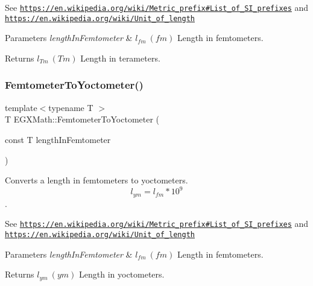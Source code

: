 See \href{https://en.wikipedia.org/wiki/Metric_prefix#List_of_SI_prefixes}{\tt https\+://en.\+wikipedia.\+org/wiki/\+Metric\+\_\+prefix\#\+List\+\_\+of\+\_\+\+S\+I\+\_\+prefixes} and \href{https://en.wikipedia.org/wiki/Unit_of_length}{\tt https\+://en.\+wikipedia.\+org/wiki/\+Unit\+\_\+of\+\_\+length} 
\begin{DoxyParams}{Parameters}
{\em length\+In\+Femtometer} & $ l_{fm}\ (fm)$ Length in femtometers. \\
\hline
\end{DoxyParams}
\begin{DoxyReturn}{Returns}
$ l_{Tm}\ (Tm)$ Length in terameters. 
\end{DoxyReturn}
\mbox{\label{group___e_g_x_math-_conversions-_length_conversions-_s_i-_femtometer-_s_i_ga6406395140da34327a85098a7dd9e4f0}} 
\subsubsection{\texorpdfstring{Femtometer\+To\+Yoctometer()}{FemtometerToYoctometer()}}
{\footnotesize\ttfamily template$<$typename T $>$ \\
T E\+G\+X\+Math\+::\+Femtometer\+To\+Yoctometer (\begin{DoxyParamCaption}\item[{const T}]{length\+In\+Femtometer }\end{DoxyParamCaption})}



Converts a length in femtometers to yoctometers. \[ l_{ym}=l_{fm} * 10^{9} \]. 

See \href{https://en.wikipedia.org/wiki/Metric_prefix#List_of_SI_prefixes}{\tt https\+://en.\+wikipedia.\+org/wiki/\+Metric\+\_\+prefix\#\+List\+\_\+of\+\_\+\+S\+I\+\_\+prefixes} and \href{https://en.wikipedia.org/wiki/Unit_of_length}{\tt https\+://en.\+wikipedia.\+org/wiki/\+Unit\+\_\+of\+\_\+length} 
\begin{DoxyParams}{Parameters}
{\em length\+In\+Femtometer} & $ l_{fm}\ (fm)$ Length in femtometers. \\
\hline
\end{DoxyParams}
\begin{DoxyReturn}{Returns}
$ l_{ym}\ (ym)$ Length in yoctometers. 
\end{DoxyReturn}
\mbox{\label{group___e_g_x_math-_conversions-_length_conversions-_s_i-_femtometer-_s_i_gabee380e1753dab5aa9aa433b8f3ce4d4}} 
